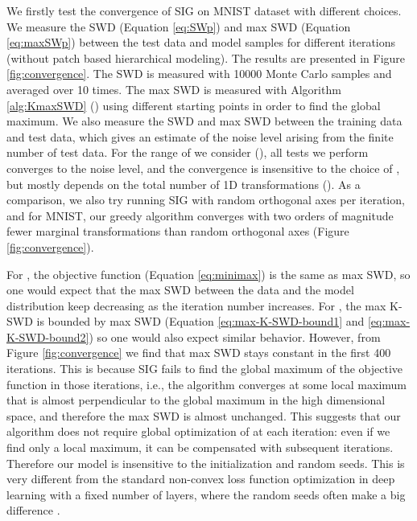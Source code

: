 \documentclass{article}
\begin{document}
We firstly test the convergence of SIG on MNIST dataset with different  choices. We measure the SWD (Equation \ref{eq:SWp}) and max SWD (Equation \ref{eq:maxSWp}) between the test data and model samples for different iterations (without patch based hierarchical modeling). The results are presented in Figure \ref{fig:convergence}. The SWD is measured with 10000 Monte Carlo samples and averaged over 10 times. The max SWD is measured with Algorithm \ref{alg:KmaxSWD} () using different starting points in order to find the global maximum. We also measure the SWD and max SWD between the training data and test data, which gives an estimate of the noise level arising from the finite number of test data. For the range of  we consider (), all tests we perform converges to the noise level, and the convergence is insensitive to the choice of , but mostly depends on the total number of 1D transformations (). As a comparison, we also try running SIG with random orthogonal axes per iteration, and for MNIST, our greedy algorithm converges with two orders of magnitude fewer marginal transformations than random orthogonal axes (Figure \ref{fig:convergence}).

For , the objective function (Equation \ref{eq:minimax}) is the same as max SWD, so one would expect that the max SWD between the data and the model distribution keep decreasing as the iteration number increases. For , the max K-SWD is bounded by max SWD (Equation \ref{eq:max-K-SWD-bound1} and \ref{eq:max-K-SWD-bound2}) so one would also expect similar behavior. However, from Figure \ref{fig:convergence} we find that max SWD stays constant in the first 400 iterations. This is because SIG fails to find the global maximum of the objective function in those iterations, i.e., the algorithm converges at some local maximum that is almost perpendicular to the global maximum in the high dimensional space, and therefore the max SWD is almost unchanged. This suggests that our algorithm does not require global optimization of  at each iteration: even if we find only a local maximum, it can be compensated with subsequent iterations. Therefore our model is insensitive to the initialization and random seeds. This is very different from the standard non-convex loss function optimization in deep learning with a fixed number of layers, where the random seeds often make a big difference \citep{lucic2018gans}.
\end{document}
